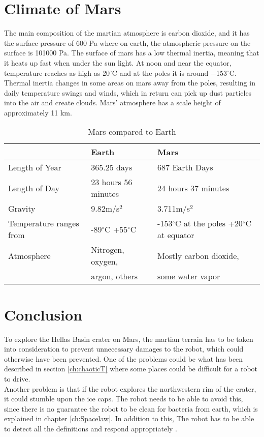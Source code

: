 \section{Climate of Mars}
The main composition of the martian atmosphere is carbon dioxide, and it has the surface pressure of 600 Pa where on earth, the atmospheric pressure on the surface is 101000 Pa.
\newline The surface of mars has a low thermal inertia, meaning that it heats up fast when under the sun light. At noon and near the equator, temperature reaches as high as 20$^{\circ}$C and at the poles it is around −153$^{\circ}$C. Thermal inertia changes in some areas on mars away from the poles, resulting in daily temperature swings and winds, which in return can pick up dust particles into the air and create clouds. Mars' atmosphere has a scale height of approximately 11 km\cite{climate}.
\begin{table} [h]
    \centering
    \begin{tabu} to 1\textwidth { | X[c] X[c] X[c] | }
     \hline
      & Earth & Mars \\ 
     \hline
     Length of Year & 365.25 days & 687 Earth Days \\
     \hline
     Length of Day & 23 hours 56 minutes & 24 hours 37 minutes \\
     \hline
     Gravity & 9.82m/s$^2$ & 3.711m/s$^2$ \\
     \hline
     Temperature ranges from & -89$^{\circ}$C +55$^{\circ}$C &-153$^{\circ}$C at the poles +20$^{\circ}$C at equator \\
     \hline
     Atmosphere & Nitrogen, oxygen, & Mostly carbon dioxide, \\
      & argon, others & some water vapor \\
     \hline
    \end{tabu}
    \caption{Mars compared to Earth\cite{MarsVSEarth}}
    \label{tab:marsEarthFacts}
\end{table}

\newpage

\section{Conclusion}
To explore the Hellas Basin crater on Mars, the martian terrain has to be taken into consideration to prevent unnecessary damages to the robot, which could otherwise have been prevented.
One of the problems could be what has been described in section \ref{ch:chaoticT} where some places could be difficult for a robot to drive.\\
Another problem is that if the robot explores the northwestern rim of the crater, it could stumble upon the ice caps. The robot needs to be able to avoid this, since there is no guarantee the robot to be clean for bacteria from earth, which is explained in chapter \ref{ch:Spacelaw}. In addition to this, The robot has to be able to detect all the definitions and respond appropriately \cite{AspectsWeather}.



